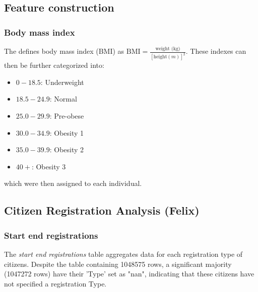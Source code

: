 \documentclass[12pt]{article}
\begin{document}

\subsection{Feature construction}
		
		\subsubsection{Body mass index}
		
		The \cite{WHO_BMI} defines body mass index (BMI) as $\text{BMI} = \frac{\text{weight (kg)}}{\left[\text{height} (m)\right]^2}$. These indexes can then be further categorized into:
		
		\begin{itemize}
			\item $0 - 18.5$: Underweight
			\item $18.5-24.9$: Normal
			\item $25.0-29.9$: Pre-obese
			\item $30.0-34.9$: Obesity 1
			\item $35.0-39.9$: Obesity 2
			\item $40+$: Obesity 3
		\end{itemize}
		
		which were then assigned to each individual.


\subsection{Citizen Registration Analysis (Felix)}

\subsubsection{Start end registrations}
The \textit{start end registrations} table aggregates data for each registration type of citizens. 
Despite the table containing 1048575 rows, a significant majority (1047272 rows) have their 'Type' set as "nan", indicating that these citizens have not specified a registration Type.
\end{document}
